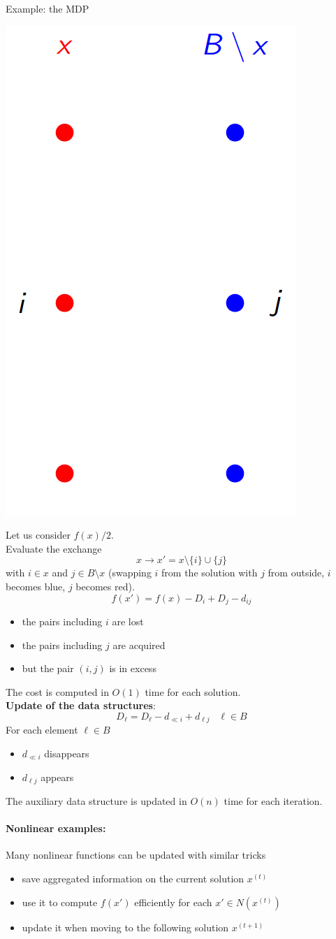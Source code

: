 \newpage


Example: the MDP
\begin{center}
	\includegraphics[width=0.25\columnwidth]{img/MDP2}
\end{center}
Let us consider $f (x) /2$.\\

Evaluate the exchange
$$ x \rightarrow x' = x \setminus \{i\} \cup \{j\} $$
with $i \in x$ and $j \in B \setminus x$ (swapping $i$ from the solution with $j$ from outside, $i$ becomes blue, $j$ becomes red).\\

$$ f (x') = f (x) − D_i + D_j − d_{ij} $$

\begin{itemize}
	\item the pairs including $i$ are lost
	\item the pairs including $j$ are acquired
	\item but the pair $(i, j)$ is in excess
\end{itemize}
The cost is computed in $O (1)$ time for each solution.\\

\textbf{Update of the data structures}:
$$ D_{\ell} = D_{\ell} - d_{\ll i} + d_{\ell j} \;\;\; \ell \in B $$
For each element $\ell \in B$
\begin{itemize}
	\item $d_{\ll i}$ disappears
	\item $d_{\ell j}$ appears
\end{itemize}

The auxiliary data structure is updated in $O (n)$ time for each iteration.\\

\newpage

\paragraph{Nonlinear examples:} Many nonlinear functions can be updated with similar tricks
\begin{itemize}
	\item save aggregated information on the current solution $x^{(t)}$
	
	\item use it to compute $f (x')$ efficiently for each $x' \in N (x^{(t)})$
	
	\item update it when moving to the following solution $x^{(t+1)}$
\end{itemize}

